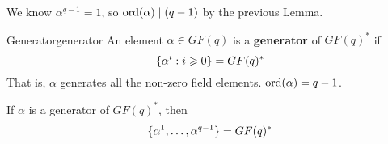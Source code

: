 \begin{Proof}{}{}
    We know $ \alpha^{q-1}=1 $, so $ \operatorname{ord}(\alpha)\mid (q-1) $ by
    the previous Lemma.
\end{Proof}

\begin{Definition}{Generator}{generator}
    An element $ \alpha\in GF(q) $ is a \textbf{generator} of
    $ GF(q)^* $ if
    \[ \{\alpha^i:i\geqslant 0\}=GF(q)^* \]
    That is, $ \alpha $ generates all the non-zero field elements.
    $ \operatorname{ord}(\alpha)=q-1 $.
\end{Definition}

\begin{Theorem}{}{}
    If $ \alpha $ is a generator of $ GF(q)^* $, then
    \[ \{\alpha^1,\ldots ,\alpha^{q-1}\}=GF(q)^* \]
\end{Theorem}

